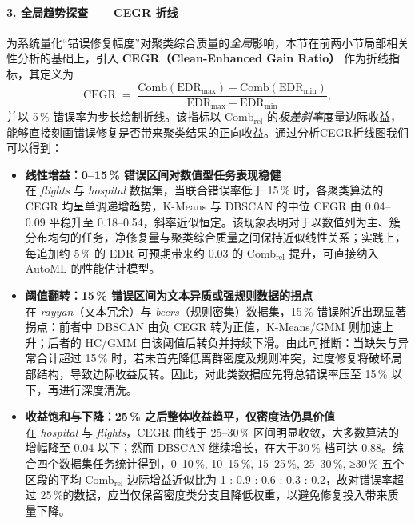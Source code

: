 \documentclass[10pt]{article} %
\numberwithin{equation}{section}
\begin{document}
\paragraph{3. 全局趋势探查——CEGR 折线}\par
为系统量化“错误修复幅度”对聚类综合质量的\emph{全局}影响，本节在前两小节局部相关性分析的基础上，引入 \textbf{CEGR（Clean-Enhanced Gain Ratio）} 作为折线指标，其定义为
\begin{equation}
  \mathrm{CEGR}
  \;=\;
  \frac{\text{Comb}(\mathrm{EDR}_{\max})-\text{Comb}(\mathrm{EDR}_{\min})}
       {\mathrm{EDR}_{\max}-\mathrm{EDR}_{\min}},
  \label{eq:cegr-def}
\end{equation}
并以 5\,\% 错误率为步长绘制折线。该指标以 \(\text{Comb}_{\text{rel}}\) 的\emph{极差斜率}度量边际收益，能够直接刻画错误修复是否带来聚类结果的正向收益。通过分析CEGR折线图我们可以得到：
\begin{itemize}[leftmargin=1.6em,itemsep=4pt]

\item \textbf{线性增益：0–15\,\% 错误区间对数值型任务表现稳健}  \\
在 \textit{flights} 与 \textit{hospital} 数据集，当联合错误率低于 15\,\% 时，各聚类算法的 CEGR 均呈单调递增趋势，K-Means 与 DBSCAN 的中位 CEGR 由 0.04–0.09 平稳升至 0.18–0.54，斜率近似恒定。\textcolor[rgb]{0.00,0.07,1.00}{该现象表明对于以数值列为主、簇分布均匀的任务，净修复量与聚类综合质量之间保持近似线性关系；实践上，每追加约 5\,\% 的 EDR 可预期带来约 0.03 的 Comb\(_{\text{rel}}\) 提升，可直接纳入 AutoML 的性能估计模型。}

\item \textbf{阈值翻转：15\,\% 错误区间为文本异质或强规则数据的拐点}  \\
在 \textit{rayyan}（文本冗余）与 \textit{beers}（规则密集）数据集，15\,\% 错误附近出现显著拐点：前者中 DBSCAN 由负 CEGR 转为正值，K-Means/GMM 则加速上升；后者的 HC/GMM 自该阈值后转负并持续下滑。由此可推断：\textcolor[rgb]{0.00,0.07,1.00}{当缺失与异常合计超过 15\,\% 时，若未首先降低离群密度及规则冲突，过度修复将破坏局部结构，导致边际收益反转。因此，对此类数据应先将总错误率压至 15\,\% 以下，再进行深度清洗。}

\item \textbf{收益饱和与下降：25\,\% 之后整体收益趋平，仅密度法仍具价值}  \\
在 \textit{hospital} 与 \textit{flights}，CEGR 曲线于 25–30\,\% 区间明显收敛，大多数算法的增幅降至 0.04 以下；然而 DBSCAN 继续增长，在大于30\,\% 档可达 0.88。\textcolor[rgb]{0.00,0.07,1.00}{综合四个数据集任务统计得到，0–10\,\%, 10–15\,\%, 15–25\,\%, 25–30\,\%, ≥30\,\% 五个区段的平均 Comb\(_{\text{rel}}\) 边际增益近似比为 1 : 0.9 : 0.6 : 0.3 : 0.2，故对错误率超过 25\,\%的数据，应当仅保留密度类分支且降低权重，以避免修复投入带来质量下降。}
\end{itemize}
\end{document}
